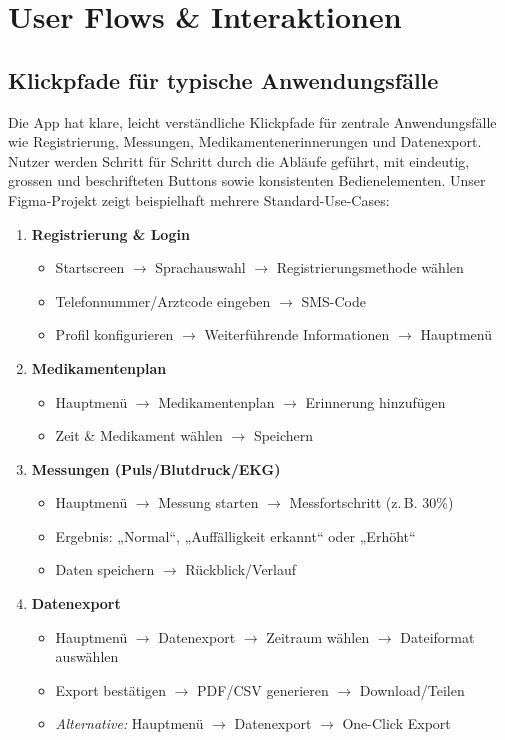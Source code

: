 \section{User Flows \& Interaktionen}
\subsection{Klickpfade für typische Anwendungsfälle}
Die App hat klare, leicht verständliche Klickpfade für zentrale Anwendungsfälle wie Registrierung, Messungen, Medikamentenerinnerungen und Datenexport. Nutzer werden Schritt für Schritt durch die Abläufe geführt, mit eindeutig, grossen und beschrifteten Buttons sowie konsistenten Bedienelementen. Unser Figma-Projekt zeigt beispielhaft mehrere Standard-Use-Cases:

\begin{enumerate}
	\item \textbf{Registrierung \& Login}
	\begin{itemize}
		\item Startscreen $\rightarrow$ Sprachauswahl $\rightarrow$ Registrierungsmethode wählen
		\item Telefonnummer/Arztcode eingeben $\rightarrow$ SMS-Code
		\item Profil konfigurieren $\rightarrow$ Weiterführende Informationen $\rightarrow$ Hauptmenü
	\end{itemize}
	
	\item \textbf{Medikamentenplan}
	\begin{itemize}
		\item Hauptmenü $\rightarrow$ Medikamentenplan $\rightarrow$ Erinnerung hinzufügen
		\item Zeit \& Medikament wählen $\rightarrow$ Speichern
	\end{itemize}
	
	\item \textbf{Messungen (Puls/Blutdruck/EKG)}
	\begin{itemize}
		\item Hauptmenü $\rightarrow$ Messung starten $\rightarrow$ Messfortschritt (z.\,B. 30\%)
		\item Ergebnis: „Normal“, „Auffälligkeit erkannt“ oder „Erhöht“
		\item Daten speichern $\rightarrow$ Rückblick/Verlauf
	\end{itemize}
	
	\item \textbf{Datenexport}
	\begin{itemize}
		\item Hauptmenü $\rightarrow$ Datenexport $\rightarrow$ Zeitraum wählen $\rightarrow$ Dateiformat auswählen
		\item Export bestätigen $\rightarrow$ PDF/CSV generieren $\rightarrow$ Download/Teilen
		\item \emph{Alternative:} Hauptmenü $\rightarrow$ Datenexport $\rightarrow$ One-Click Export
	\end{itemize}
	

\end{enumerate}
